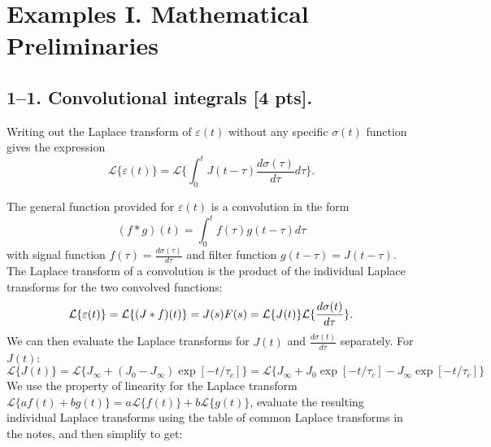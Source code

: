 % 
% 
% 

\section*{Examples I. Mathematical Preliminaries}
\label{PS1}

\bigskip
\subsection*{1--1. \textbf{Convolutional integrals} [4 pts].}

Writing out the Laplace transform of $\varepsilon(t)$ without any specific $\sigma(t)$ function gives the expression
\begin{equation}
    \mathcal{L}\{\varepsilon(t)\} = \mathcal{L}\{ \int_0^t J(t-\tau) \frac{d\sigma(\tau)}{d\tau} d\tau \}.
\end{equation}

The general function provided for $\varepsilon(t)$ is a convolution in the form 
\begin{equation}
    (f \ast g)(t) = \int_0^t{f(\tau)g(t-\tau)d\tau}
\end{equation}
with signal function $f(\tau) = \frac{d\sigma(\tau)}{d\tau}$ and filter function $g(t-\tau) = J(t-\tau)$. The Laplace transform of a convolution is the product of the individual Laplace transforms for the two convolved functions:
\begin{equation}
    \mathcal{L}\{\varepsilon(t)\} = \mathcal{L}\{ (J \ast f)(t)\} = J(s)F(s) = \mathcal{L}\{J(t)\} \space \mathcal{L}\{\frac{d\sigma(t)}{d\tau}\}.
\end{equation}
We can then evaluate the Laplace transforms for $J(t)$ and $\frac{d\sigma(t)}{d\tau}$ separately. For $J(t)$:
\begin{equation}
    \mathcal{L}\{J(t)\} = \mathcal{L}\{ J_\infty + (J_0-J_\infty)\exp[-t/\tau_c] \} = \mathcal{L}\{ J_\infty + J_0\exp[-t/\tau_c] - J_\infty\exp[-t/\tau_c]\}
\end{equation}
We use the property of linearity for the Laplace transform $\mathcal{L}\{ af(t) + bg(t)\} = a\mathcal{L}\{f(t)\} + b\mathcal{L}\{g(t)\}$, evaluate the resulting individual Laplace transforms using the table of common Laplace transforms in the notes, and then simplify to get:

